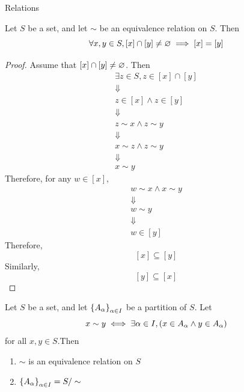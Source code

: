 \begin{section}{Relations}
\bigskip

\begin{theorem} \label{thm:EquivalenceClassesFormAPartition}
    Let $S$ be a set, and let $\sim$ be an equivalence relation on $S$. Then
    \[
    \forall x, y \in S, [x] \cap [y] \neq \vnot \implies [x] = [y]
    \]
\end{theorem}

\begin{proof}
    Assume that $[x] \cap [y] \neq \vnot$. Then
    \[
    \begin{array}{c}
        \exists z \in S, z \in [x] \cap [y] \\
        \Downarrow \\
        z \in [x] \land z \in [y] \\
        \Downarrow \\
        z \sim x \land z \sim y \\
        \Downarrow \\
        x \sim z \land z \sim y \\
        \Downarrow \\
        x \sim y
    \end{array}
    \]
    Therefore, for any $w \in [x]$,
    \[
    \begin{array}{c}
        w \sim x \land x \sim y \\
        \Downarrow \\
        w \sim y \\
        \Downarrow \\
        w \in [y]
    \end{array}
    \]
    Therefore,
    \[
    [x] \subseteq [y]
    \]
    Similarly,
    \[
    [y] \subseteq [x]
    \]
\end{proof}

\bigskip

\begin{theorem} \label{thm:PartitionDefinesEquivalenceRelation}
    Let $S$ be a set, and let $\set*{A_{\alpha}}_{\alpha \in I}$ be a partition of $S$. Let
    \[
    x \sim y \iff \exists \alpha \in I, \paren*{x \in A_{\alpha} \land y \in A_{\alpha}}
    \]
    for all $x, y \in S$.Then
    \begin{enumerate}[label=\textbf{(\Alph*)}]
        \item $\sim$ is an equivalence relation on $S$
        \item $\set*{A_{\alpha}}_{\alpha \in I} = S / \sim$
    \end{enumerate}
\end{theorem}


\end{section}
